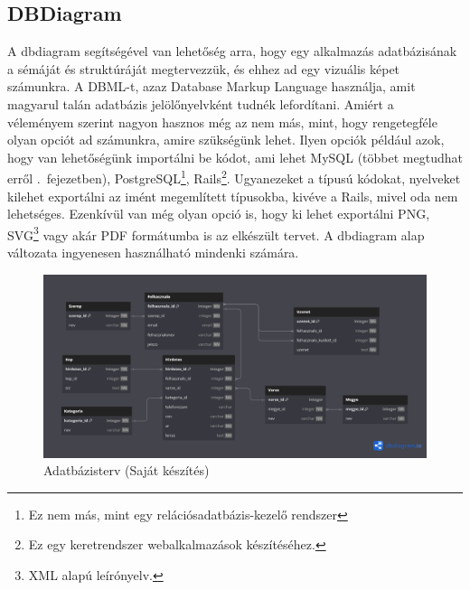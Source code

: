 \documentclass[]{thesis-ekf}
\theoremstyle{definition}
\theoremstyle{remark}
\begin{document}
	\subsection{DBDiagram}
	A dbdiagram segítségével van lehetőség arra, hogy egy alkalmazás adatbázisának a sémáját és struktúráját megtervezzük, és ehhez ad egy vizuális képet számunkra. A DBML-t, azaz Database Markup Language használja, amit magyarul talán adatbázis jelölőnyelvként tudnék lefordítani. Amiért a véleményem szerint nagyon hasznos még az nem más, mint, hogy rengetegféle olyan opciót ad számunkra, amire szükségünk lehet. Ilyen opciók például azok, hogy van lehetőségünk importálni be kódot, ami lehet MySQL (többet megtudhat erről .~fejezetben), PostgreSQL\footnote{Ez nem más, mint egy relációsadatbázis-kezelő rendszer}, Rails\footnote{Ez egy keretrendszer webalkalmazások készítéséhez.}. Ugyanezeket a típusú kódokat, nyelveket kilehet exportálni az imént megemlített típusokba, kivéve a Rails, mivel oda nem lehetséges. Ezenkívül van még olyan opció is, hogy ki lehet exportálni PNG, SVG\footnote{XML alapú leírónyelv.} vagy akár PDF formátumba is az elkészült tervet. A dbdiagram alap változata ingyenesen használható mindenki számára. \cite{Dbdiagram}
	
	\begin{figure}[ht!]
		\centering
		\includegraphics[width=15cm]{./tervezes/dbdiagram}
		\caption{Adatbázisterv (Saját készítés)} 
		\label{dbdiagram}
	\end{figure}
	
\end{document}
